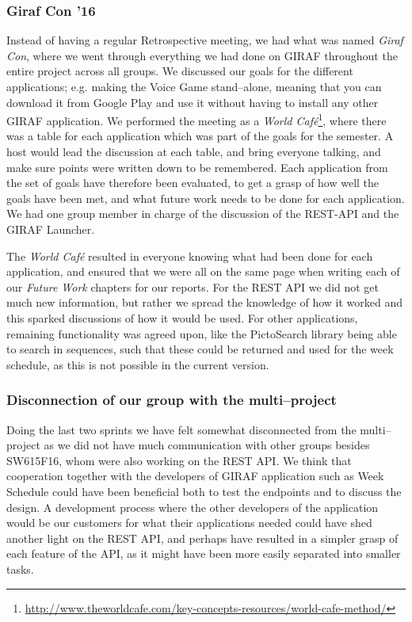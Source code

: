 \subsubsection*{Giraf Con '16}
Instead of having a regular Retrospective meeting, we had what was named \textit{Giraf Con}, where we went through everything we had done on GIRAF throughout the entire project across all groups.
We discussed our goals for the different applications; e.g. making the Voice Game stand--alone, meaning that you can download it from Google Play and use it without having to install  any other GIRAF application.
We performed the meeting as a \textit{World Café}\footnote{\url{http://www.theworldcafe.com/key-concepts-resources/world-cafe-method/}}, where there was a table for each application which was part of the goals for the semester.
A host would lead the discussion at each table, and bring everyone talking, and make sure points were written down to be remembered.
Each application from the set of goals have therefore been evaluated, to get a grasp of how well the goals have been met, and what future work needs to be done for each application.
We had one group member in charge of the discussion of the REST-API and the GIRAF Launcher.

The \textit{World Café} resulted in everyone knowing what had been done for each application, and ensured that we were all on the same page when writing each of our \textit{Future Work} chapters for our reports.
For the REST API we did not get much new information, but rather we spread the knowledge of how it worked and this sparked discussions of how it would be used.
For other applications, remaining functionality was agreed upon, like the PictoSearch library being able to search in sequences, such that these could be returned and used for the week schedule, as this is not possible in the current version.

\subsubsection*{Disconnection of our group with the multi–project}
Doing the last two sprints we have felt somewhat disconnected from the multi--project as we did not have much communication with other groups besides SW615F16, whom were also working on the REST API.
We think that cooperation together with the developers of GIRAF application such as Week Schedule could have been beneficial both to test the endpoints and to discuss the design.
A development process where the other developers of the application would be our customers for what their applications needed could have shed another light on the REST API, and perhaps have resulted in a simpler grasp of each feature of the API, as it might have been more easily separated into smaller tasks.

